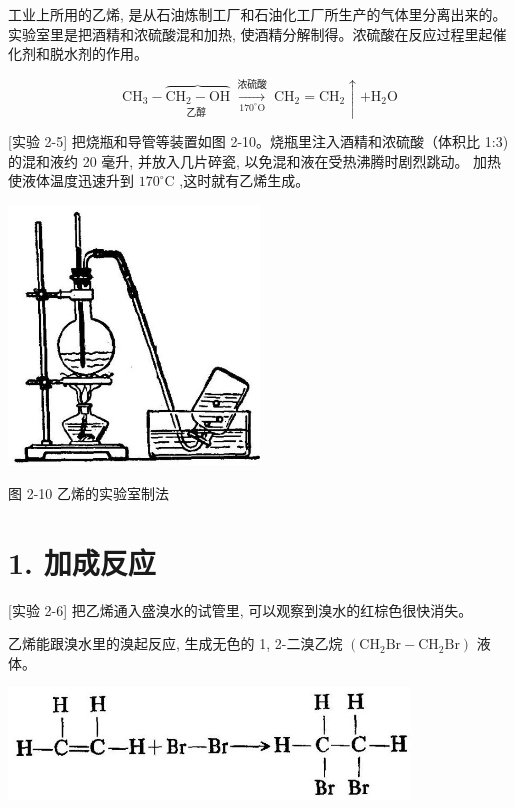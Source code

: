 \documentclass[10pt]{article}
\begin{document}
工业上所用的乙烯, 是从石油炼制工厂和石油化工厂所生产的气体里分离出来的。实验室里是把酒精和浓硫酸混和加热, 使酒精分解制得。浓硫酸在反应过程里起催化剂和脱水剂的作用。

\[
{\mathrm{{CH}}}_{3} - \underset{\text{乙醇 }}{\overbrace{{\mathrm{{CH}}}_{2} - \mathrm{{OH}}}}\underset{{170}^{ \circ }\mathrm{O}}{\overset{\text{ 浓硫酸 }}{ \rightarrow }}{\mathrm{{CH}}}_{2} = {\mathrm{{CH}}}_{2} \uparrow + {\mathrm{H}}_{2}\mathrm{O}
\]

[实验 2-5] 把烧瓶和导管等装置如图 2-10。烧瓶里注入酒精和浓硫酸（体积比 1:3) 的混和液约 20 毫升, 并放入几片碎瓷, 以免混和液在受热沸腾时剧烈跳动。 加热使液体温度迅速升到 \({170}^{ \circ }\mathrm{C}\) ,这时就有乙烯生成。

\begin{center}
\includegraphics[max width=0.5\textwidth]{images/01912d16-be99-77bb-9535-4f3ed8d9946f_71_325898.jpg}
\end{center}

图 2-10 乙烯的实验室制法

\section*{1. 加成反应}

[实验 2-6] 把乙烯通入盛溴水的试管里, 可以观察到溴水的红棕色很快消失。

乙烯能跟溴水里的溴起反应, 生成无色的 1, 2-二溴乙烷 \(\left( {{\mathrm{{CH}}}_{2}\mathrm{{Br}} - {\mathrm{{CH}}}_{2}\mathrm{{Br}}}\right)\) 液体。

\begin{center}
\includegraphics[max width=0.8\textwidth]{images/01912d16-be99-77bb-9535-4f3ed8d9946f_71_330904.jpg}
\end{center}
\end{document}
